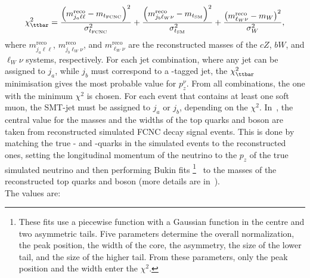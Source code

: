 \begin{equation}
\chi^2_{\ttbar}  =  \frac{\left(m^{\mathrm{reco}}_{j_a\ell\ell}-m_{t_{\mathrm{FCNC}}}\right)^2}{\sigma_{t_{\mathrm{FCNC}}}^2}+
\frac{\left(m^{\mathrm{reco}}_{j_b\ell_W\nu}-m_{t_{\mathrm{SM}}}\right)^2}{\sigma_{t_{\mathrm{SM}}}^2}
+ \frac{\left(m^{\mathrm{reco}}_{\ell_W\nu}-m_W\right)^2}{\sigma_W^2},
\label{eq:chi2tt}
\end{equation}
where $m^{\mathrm{reco}}_{j_a\ell\ell}$, 
$m^{\mathrm{reco}}_{j_b\ell_W\nu}$, and $m^{\mathrm{reco}}_{\ell_W\nu}$ are 
the reconstructed masses of the $cZ$, $bW$, and $\ell_W\nu$ systems, respectively.
For each jet combination, where any jet can be assigned to $j_a$, while $j_b$ must correspond to a \Pqb-tagged jet, the $\chi^2_{\ttbar}$ minimisation gives the most probable value for $p^{\nu}_z$. From all combinations, the one with the minimum $\chi^2$ is chosen.
For each event that contains at least one soft muon, the SMT-jet must be assigned to $j_a$ or $j_b$, depending on the $\chi^2$.
In~, the central value for the masses and the widths of the top quarks and \PW boson are taken from reconstructed simulated FCNC \ttbar decay signal events. This is done by matching the true \Pqc- and \Pqb-quarks in the simulated events to the reconstructed ones, setting the longitudinal momentum of the neutrino to the $p_z$ of the true simulated neutrino and then performing Bukin fits
\footnote{These fits use a piecewise function with  a Gaussian function in the centre and two 		
	asymmetric tails. Five parameters determine the overall normalization, the peak position, the width of the core, the asymmetry, the size of the lower tail, and the size of the higher tail. From these parameters, only the peak position and the width enter the $\chi^2$.}~\cite{Bukin} 
to the masses of the reconstructed top quarks and \PW boson (more details are in~). \\
The values are: 
